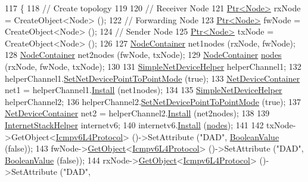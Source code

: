 \begin{DoxyCode}
117 \{
118   \textcolor{comment}{// Create topology}
119 
120   \textcolor{comment}{// Receiver Node}
121   \hyperlink{classns3_1_1Ptr}{Ptr<Node>} rxNode = CreateObject<Node> ();
122   \textcolor{comment}{// Forwarding Node}
123   \hyperlink{classns3_1_1Ptr}{Ptr<Node>} fwNode = CreateObject<Node> ();
124   \textcolor{comment}{// Sender Node}
125   \hyperlink{classns3_1_1Ptr}{Ptr<Node>} txNode = CreateObject<Node> ();
126 
127   \hyperlink{classns3_1_1NodeContainer}{NodeContainer} net1nodes (rxNode, fwNode);
128   \hyperlink{classns3_1_1NodeContainer}{NodeContainer} net2nodes (fwNode, txNode);
129   \hyperlink{classns3_1_1NodeContainer}{NodeContainer} \hyperlink{visualizer-ideas_8txt_a3e1b3808014a2c68ab0cd0182e041be2}{nodes} (rxNode, fwNode, txNode);
130 
131   \hyperlink{classns3_1_1SimpleNetDeviceHelper}{SimpleNetDeviceHelper} helperChannel1;
132   helperChannel1.\hyperlink{classns3_1_1SimpleNetDeviceHelper_a474460ba6942d4933f443a97df7d4716}{SetNetDevicePointToPointMode} (\textcolor{keyword}{true});
133   \hyperlink{classns3_1_1NetDeviceContainer}{NetDeviceContainer} net1 = helperChannel1.\hyperlink{classns3_1_1SimpleNetDeviceHelper_a35bed9cee32d306362d3e24dfeef4513}{Install} (net1nodes);
134 
135   \hyperlink{classns3_1_1SimpleNetDeviceHelper}{SimpleNetDeviceHelper} helperChannel2;
136   helperChannel2.\hyperlink{classns3_1_1SimpleNetDeviceHelper_a474460ba6942d4933f443a97df7d4716}{SetNetDevicePointToPointMode} (\textcolor{keyword}{true});
137   \hyperlink{classns3_1_1NetDeviceContainer}{NetDeviceContainer} net2 = helperChannel2.\hyperlink{classns3_1_1SimpleNetDeviceHelper_a35bed9cee32d306362d3e24dfeef4513}{Install} (net2nodes);
138 
139   \hyperlink{classns3_1_1InternetStackHelper}{InternetStackHelper} internetv6;
140   internetv6.\hyperlink{classns3_1_1InternetStackHelper_a6645b412f31283d2d9bc3d8a95cebbc0}{Install} (\hyperlink{visualizer-ideas_8txt_a3e1b3808014a2c68ab0cd0182e041be2}{nodes});
141 
142   txNode->GetObject<\hyperlink{classns3_1_1Icmpv6L4Protocol}{Icmpv6L4Protocol}> ()->SetAttribute (\textcolor{stringliteral}{"DAD"}, 
      \hyperlink{classns3_1_1BooleanValue}{BooleanValue} (\textcolor{keyword}{false}));
143   fwNode->\hyperlink{classns3_1_1Object_a13e18c00017096c8381eb651d5bd0783}{GetObject}<\hyperlink{classns3_1_1Icmpv6L4Protocol}{Icmpv6L4Protocol}> ()->SetAttribute (\textcolor{stringliteral}{"DAD"}, 
      \hyperlink{classns3_1_1BooleanValue}{BooleanValue} (\textcolor{keyword}{false}));
144   rxNode->\hyperlink{classns3_1_1Object_a13e18c00017096c8381eb651d5bd0783}{GetObject}<\hyperlink{classns3_1_1Icmpv6L4Protocol}{Icmpv6L4Protocol}> ()->SetAttribute (\textcolor{stringliteral}{"DAD"}, 

\end{DoxyCode}
